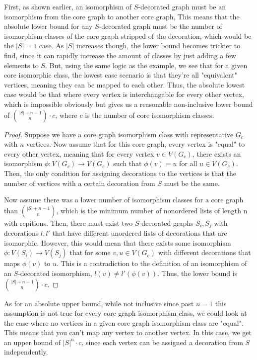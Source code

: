 \documentclass[11pt,reqno]{amsart}
\theoremstyle{definition}
\begin{document}
First, as shown earlier, an isomorphism of $S$-decorated graph must be an isomorphism from the core graph to another core graph, This means that the absolute lower bound for any $S$-decorated graph must be the number of isomorphism classes of the core graph stripped of the decoration, which would be the $|S| = 1$ case. As $|S|$ increases though, the lower bound becomes trickier to find, since it can rapidly increase the amount of classes by just adding a few elements to $S$. But, using the same logic as the example, we see that for a given core isomorphic class, the lowest case scenario is that they're all "equivalent" vertices, meaning they can be mapped to each other. Thus, the absolute lowest case would be that where every vertex is interchangable for every other vertex, which is impossible obviously but gives us a reasonable non-inclusive lower bound of $\binom{|S| + n - 1}{n} \cdot c$, where $c$ is the number of core isomorphism classes.

\begin{proof}
    Suppose we have a core graph isomorphism class with representative $G_c$ with $n$ vertices. Now assume that for this core graph, every vertex is "equal" to every other vertex, meaning that for every vertex $v \in V(G_c)$, there exists an isomorphism $\phi: V(G_c) \rightarrow V(G_c)$ such that $\phi(v) = u$ for all $u \in V(G_c)$. Then, the only condition for assigning decorations to the vertices is that the number of vertices with a certain decoration from $S$ must be the same. 

    Now assume there was a lower number of isomorphism classes for a core graph than $\binom{|S| + n - 1}{n}$, which is the minimum number of nonordered lists of length n with repitions. Then, there must exist two $S$-decorated graphs $S_i, S_j$ with decorations  $l, l'$ that have different unordered lists of decorations that are isomorphic. However, this would mean that there exists some isomorphism $\phi: V(S_i) \rightarrow V(S_j)$ that for some $v, u \in V(G_c)$ with different decorations that maps $\phi(v)$ to $u$. This is a contradiction to the definition of an isomorphism of an $S$-decorated isomorphism, $l(v) \neq l'(\phi(v))$. Thus, the lower bound is $\binom{|S| + n - 1}{n} \cdot c$.
\end{proof}

As for an absolute upper bound, while not inclusive since past $n = 1$ this assumption is not true for every core graph isomorphism class, we could look at the case where no vertices in a given core graph isomorphism class are "equal". This means that you can't map any vertex to another vertex. In this case, we get an upper bound of $|S|^n \cdot c$, since each vertex can be assigned a decoration from $S$ independently. 
\end{document}
